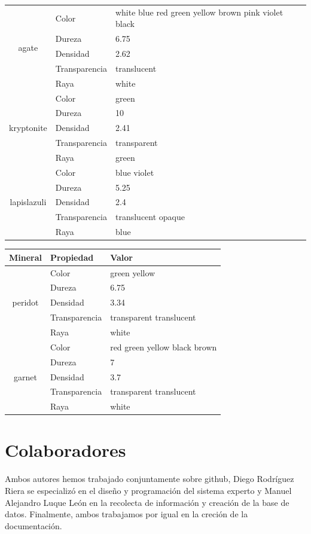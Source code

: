 \documentclass[a4paper,10pt]{article}
\begin{document}
\begin{tabular}{|c|l|l|}
    \multirow{5}{*}{agate} 
        & Color & white blue red green yellow brown pink violet black \\
        & Dureza & 6.75 \\
        & Densidad & 2.62 \\
        & Transparencia & translucent \\
        & Raya & white \\ \hline
    \multirow{5}{*}{kryptonite} 
        & Color & green \\
        & Dureza & 10 \\
        & Densidad & 2.41 \\
        & Transparencia & transparent \\
        & Raya & green \\ \hline
    \multirow{5}{*}{lapislazuli} 
        & Color & blue violet \\
        & Dureza & 5.25 \\
        & Densidad & 2.4 \\
        & Transparencia & translucent opaque \\
        & Raya & blue \\ \hline
\end{tabular}
        
\begin{tabular}{|c|l|l|}
    \hline
    Mineral & Propiedad & Valor \\ \hline
    \multirow{5}{*}{peridot} 
        & Color & green yellow \\
        & Dureza & 6.75 \\
        & Densidad & 3.34 \\
        & Transparencia & transparent translucent \\
        & Raya & white \\ \hline
    \multirow{5}{*}{garnet} 
        & Color & red green yellow black brown \\
        & Dureza & 7 \\
        & Densidad & 3.7 \\
        & Transparencia & transparent translucent \\
        & Raya & white \\ \hline
\end{tabular}



\pagebreak 

\section{Colaboradores}
Ambos autores hemos trabajado conjuntamente sobre github, Diego Rodríguez Riera se especializó en el diseño y programación del sistema experto y Manuel Alejandro Luque León en la recolecta de información y creación de la base de datos. Finalmente, ambos trabajamos por igual en la creción de la documentación.
\pagebreak

\nocite{*}



\end{document}
